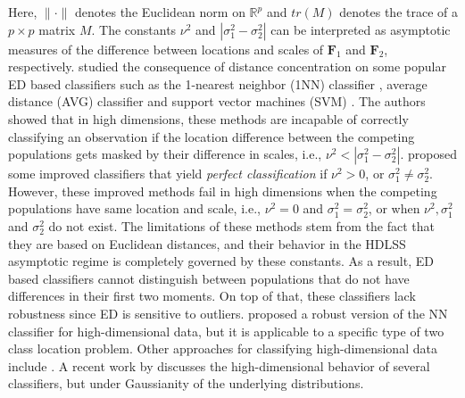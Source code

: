 \documentclass[twoside]{article}
\newcommand{\bF}{\mathbf{F}}
\newcommand{\0}{\mathbf{0}}
\newcommand{\1}{\mathbf{1}}
\numberwithin{equation}{section}
\begin{document}
Here, $\|\cdot\|$ denotes the Euclidean norm on $\mathbb{R}^p$ and $tr (M)$ denotes the trace of a $p\times p$ matrix $M$. The constants $\nu^2$ and $|\sigma_1^2-\sigma_2^2|$ can be interpreted as asymptotic measures of the difference between locations and scales of $\bF_1$ and $\bF_2$, respectively. \cite{HMN05} studied the consequence of distance concentration on some popular ED based classifiers such as the 1-nearest neighbor (1NN) classifier \citep[][]{hastie2009elements}, average distance (AVG) classifier \citep[][]{CH2009} and support vector machines (SVM) \citep[][]{vapnik1998statistical}. The authors showed that in high dimensions, these methods  are incapable of correctly classifying an observation if the location difference between the competing populations gets masked by their difference in scales, i.e., $\nu^2<|\sigma_1^2-\sigma_2^2|$. \cite{CH2009,dutta2016some} proposed some improved classifiers that yield {\it perfect classification} if $\nu^2>0$, or $\sigma_1^2\neq\sigma_2^2$. However, these improved methods fail in high dimensions when the competing populations have same location and scale, i.e., $\nu^2=0$ and $\sigma_1^2=\sigma_2^2$, or when $\nu^2,\sigma_1^2$ and $\sigma_2^2$ do not exist. The limitations of these methods stem from the fact that they are based on Euclidean distances, and their behavior in the HDLSS asymptotic regime is completely governed by these constants. As a result, ED based classifiers cannot distinguish between populations that do not have differences in their first two moments. On top of that, these classifiers lack robustness since ED is sensitive to outliers. \cite{chan2009robust} proposed a robust version of the NN classifier for high-dimensional data, but it is applicable to a specific type of two class location problem. Other approaches for classifying high-dimensional data include \cite{globerson2005metric,tomavsev2014hubness,weinberger2009distance}. A recent work by \cite{thrampoulidis2020theoretical} discusses the high-dimensional behavior of several classifiers, but under Gaussianity of the underlying distributions. %
\end{document}
